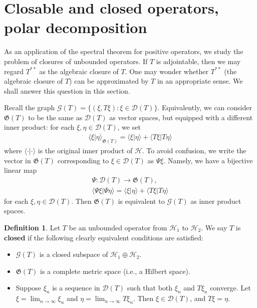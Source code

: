 \documentclass[12pt,b5paper,notitlepage]{article}
\theoremstyle{definition}
\newtheorem{df}{Definition}[section]
\theoremstyle{plain}
\newcommand{\fk}{\mathfrak}
\newcommand{\mc}{\mathcal}
\newcommand{\Dom}{\scr D}
\newcommand{\bk}[1]{\langle {#1}\rangle}
\newcommand{\scr}{\mathscr}
\numberwithin{equation}{section}
\begin{document}
\section{Closable and closed operators, polar decomposition}

As an application of the spectral theorem for positive operators, we study the problem of closures of unbounded operators. If $T$ is adjointable, then we may regard $T^{**}$ as the algebraic closure of $T$. One may wonder whether $T^{**}$ (the algebraic closure of $T$) can be approximated by $T$ in an appropriate sense. We shall answer this question in this section.

Recall the graph $\scr G(T)=\{(\xi,T\xi):\xi\in\Dom(T)\}$. Equivalently, we can consider $\fk G(T)$ \index{GT@$\scr G(T),\fk G(T)$} to be the same as $\Dom(T)$ as vector spaces, but equipped with a different inner product: for each $\xi,\eta\in\Dom(T)$, we set
\begin{align}
\bk{\xi|\eta}_{\fk G(T)}=\bk{\xi|\eta}+\bk{T\xi|T\eta}\label{eq11}
\end{align}
where $\bk {\cdot|\cdot}$ is the original inner product of $\mc H$. To avoid confusion, we write the vector in $\fk G(T)$ corresponding to $\xi\in\Dom(T)$ as $\Psi\xi$. Namely, we have a bijective linear map
\begin{gather}\label{eq27}
\Psi:\Dom(T)\rightarrow\fk G(T),\nonumber\\
\bk{\Psi\xi|\Psi\eta}=\bk{\xi|\eta}+\bk{T\xi|T\eta}	\label{eq7}
\end{gather}
for each $\xi,\eta\in\Dom(T)$. Then $\fk G(T)$ is equivalent to $\scr G(T)$ as inner product spaces.



\begin{df}
Let $T$ be an unbounded operator from $\mc H_1$ to $\mc H_2$. We say $T$ is \textbf{closed} if the following clearly equivalent conditions are satisfied:
\begin{itemize}
\item $\scr G(T)$ is a closed subspace of $\mc H_1\oplus\mc H_2$.
\item $\fk G(T)$ is a complete metric space (i.e., a Hilbert space).
\item Suppose $\xi_n$ is a sequence in $\Dom(T)$ such that both $\xi_n$ and $T\xi_n$ converge. Let $\xi=\lim_{n\rightarrow\infty}\xi_n$ and $\eta=\lim_{n\rightarrow\infty}T\xi_n$. Then $\xi\in\Dom(T)$, and $T\xi=\eta$.
\end{itemize}
\end{df}
\end{document}
